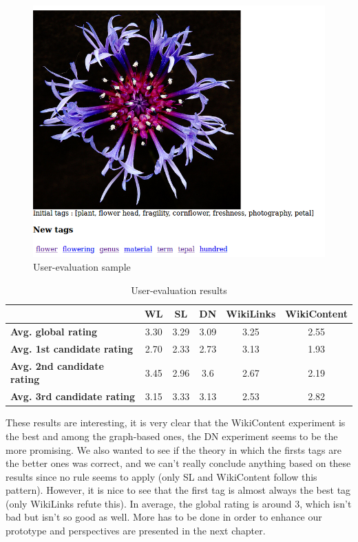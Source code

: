 \begin{figure}
  \includegraphics[scale=0.6]{./Primitives/exampleEval}
  \caption{User-evaluation sample}
  \label{fig:userEval}
\end{figure}

\begin{table}[!h]
\centering
\begin{tabular}{|l|c|c|c|c|c|}
\hline
{\bf } & {\bf WL} & {\bf SL} & {\bf DN} & {\bf WikiLinks} & {\bf WikiContent} \\ \hline
{\bf Avg.  global rating} & 3.30 & 3.29 & 3.09 & 3.25 & 2.55 \\ \hline
{\bf Avg. 1st candidate rating} & 2.70 & 2.33 & 2.73 & 3.13 & 1.93 \\ \hline
{\bf Avg. 2nd candidate rating} & 3.45 & 2.96 & 3.6 & 2.67 & 2.19 \\ \hline
{\bf Avg. 3rd candidate rating}  & 3.15 & 3.33 & 3.13 & 2.53 & 2.82 \\ \hline
\end{tabular}
\caption{User-evaluation results}
\label{table:userEval}
\end{table}

These results are interesting, it is very clear that the WikiContent experiment is the best and among the graph-based ones, the DN experiment seems to be the more promising. We also wanted to see if the theory in which the firsts tags are the better ones was correct, and we can't really conclude anything based on these results since no rule seems to apply (only SL and WikiContent follow this pattern). However, it is nice to see that the first tag is almost always the best tag (only WikiLinks refute this). In average, the global rating is around 3, which isn't bad but isn't so good as well. More has to be done in order to enhance our prototype and perspectives are presented in the next chapter.

